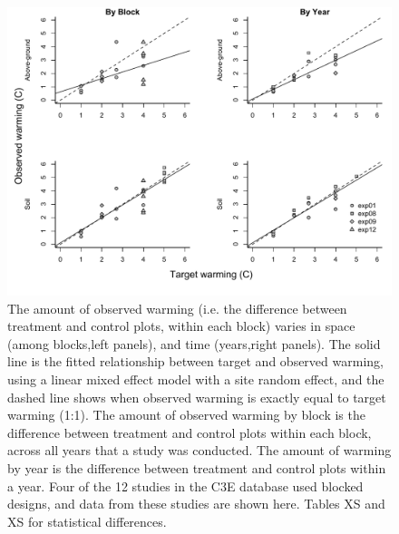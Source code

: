 \documentclass{article}
\begin{document}
 \begin{figure}[p]
   \centering
 \includegraphics{../Analyses/figures/blockyearvar.pdf}  
 \caption{The amount of observed warming (i.e. the difference between treatment and control plots, within each block) varies in space (among blocks,left panels), and time (years,right panels). The solid line is the fitted relationship between target and observed warming, using a linear mixed effect model with a site random effect, and the dashed line shows when observed warming is exactly equal to target warming (1:1). The amount of observed warming by block is the difference between treatment and control plots within each block, across all years that a study was conducted. The amount of warming by year is the difference between treatment and control plots within a year. Four of the 12 studies in the C3E database used blocked designs, and data from these studies are shown here. Tables XS and XS for statistical differences. }
 \label{fig:blockyear}

 \end{figure}
\clearpage
\end{document}
